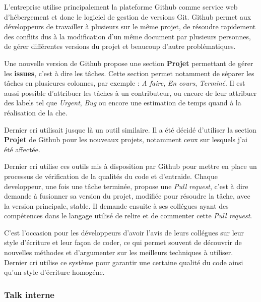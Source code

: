 L'entreprise utilise principalement la plateforme Github comme service
web d'hébergement et donc le logiciel de gestion de versions Git. Github
permet aux développeurs de travailler à plusieurs sur le même projet, de
résoudre rapidement des conflits dus à la modification d'un même
document par plusieurs personnes, de gérer différentes versions du
projet et beaucoup d'autre problématiques.

\bigskip

Une nouvelle version de Github propose une section \textbf{Projet}
permettant de gérer les \textbf{issues}, c'est à dire les tâches. Cette
section permet notamment de séparer les tâches en plusieures colonnes,
par exemple : \emph{A faire}, \emph{En cours}, \emph{Terminé}. Il est
aussi possible d'attribuer les tâches à un contributeur, ou encore de
leur attribuer des labels tel que \emph{Urgent}, \emph{Bug} ou encore
une estimation de temps quand à la réalisation de la che.

\bigskip

Dernier cri utilisait jusque là un outil similaire. Il a été décidé
d'utiliser la section \textbf{Projet} de Github pour les nouveaux
projets, notamment ceux sur lesquels j'ai été affectée.

\bigskip

Dernier cri utilise ces outils mis à disposition par Github pour mettre
en place un processus de vérification de la qualités du code et
d'entraide. Chaque developpeur, une fois une tâche terminée, propose une
\emph{Pull request}, c'est à dire demande à fusionner sa version du
projet, modifiée pour résoudre la tâche, avec la version principale,
stable. Il demande ensuite à ses collégues ayant des compétences dans le
langage utilisé de relire et de commenter cette \emph{Pull request}.

\bigskip

C'est l'occasion pour les développeurs d'avoir l'avis de leurs collégues
sur leur style d'écriture et leur façon de coder, ce qui permet souvent
de découvrir de nouvelles méthodes et d'argumenter sur les meilleurs
techniques à utiliser. Dernier cri utilise ce système pour garantir une
certaine qualité du code ainsi qu'un style d'écriture homogéne.

\bigskip

\subsubsection{Talk interne}\label{talk-interne}

